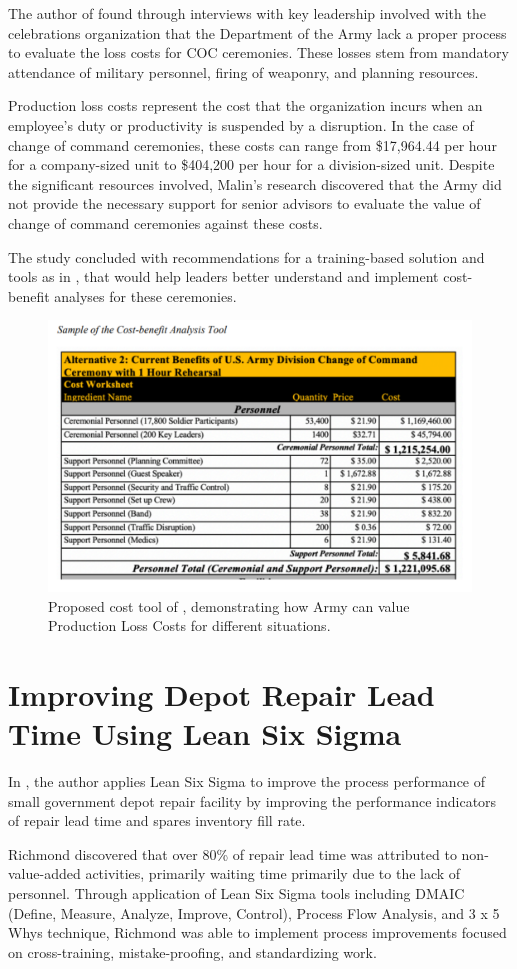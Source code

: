 \documentclass{article}
\begin{document}
			The author of \cite{Malin2020} found through interviews with key leadership involved with the celebrations organization that the Department of the Army lack a proper process to evaluate the loss costs for COC ceremonies.
			These losses stem from mandatory attendance of military personnel, firing of weaponry, and planning resources.

			Production loss costs represent the cost that the organization incurs when an employee's duty or productivity is suspended by a disruption. In the case of change of command ceremonies, these costs can range from \$17,964.44 per hour for a company-sized unit to \$404,200 per hour for a division-sized unit. 
			Despite the significant resources involved, Malin's research discovered that the Army did not provide the necessary support for senior advisors to evaluate the value of change of command ceremonies against these costs.

			The study concluded with recommendations for a training-based solution and tools as in , that would help leaders better understand and implement cost-benefit analyses for these ceremonies. 
			
			\begin{figure}[htbp]
			\centering
			\includegraphics[width=0.4\linewidth,height=0.4\textheight,keepaspectratio]{figures/cost_tool.pdf}
			\caption{Proposed cost tool of \cite{Malin2020}, demonstrating how Army can value Production Loss Costs for different situations.}
			\label{fig:loss_tool}
			\end{figure}

		
		\section{Improving Depot Repair Lead Time Using Lean Six Sigma \cite{Richmond2023}}

			In \cite{Richmond2023}, the author applies Lean Six Sigma to improve the process performance of small government depot repair facility by improving the performance indicators of repair lead time and spares inventory fill rate.

			Richmond discovered that over 80\% of repair lead time was attributed to non-value-added activities, primarily waiting time primarily due to the lack of personnel.
			Through application of Lean Six Sigma tools including DMAIC (Define, Measure, Analyze, Improve, Control), Process Flow Analysis, and 3 x 5 Whys technique, Richmond was able to implement process improvements focused on cross-training, mistake-proofing, and standardizing work.
\end{document}
